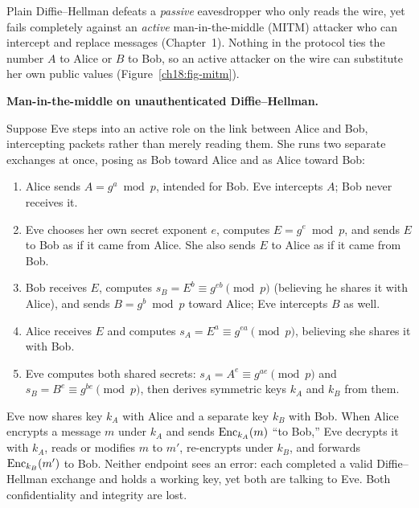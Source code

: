 Plain Diffie--Hellman defeats a \emph{passive} eavesdropper who only reads the wire, yet fails completely against an \emph{active} man-in-the-middle (MITM) attacker who can intercept and replace messages (Chapter~1). Nothing in the protocol ties the number $A$ to Alice or $B$ to Bob, so an active attacker on the wire can substitute her own public values (Figure~\ref{ch18:fig-mitm}).

\begin{attackbox}
\textbf{Man-in-the-middle on unauthenticated Diffie--Hellman.}

Suppose Eve steps into an active role on the link between Alice and Bob, intercepting packets rather than merely reading them. She runs two separate exchanges at once, posing as Bob toward Alice and as Alice toward Bob:

\begin{enumerate}
  \item Alice sends $A = g^a \bmod p$, intended for Bob. Eve intercepts $A$; Bob never receives it.
  \item Eve chooses her own secret exponent $e$, computes $E = g^e \bmod p$, and sends $E$ to Bob as if it came from Alice. She also sends $E$ to Alice as if it came from Bob.
  \item Bob receives $E$, computes $s_B = E^b \equiv g^{eb} \pmod p$ (believing he shares it with Alice), and sends $B = g^b \bmod p$ toward Alice; Eve intercepts $B$ as well.
  \item Alice receives $E$ and computes $s_A = E^a \equiv g^{ea} \pmod p$, believing she shares it with Bob.
  \item Eve computes both shared secrets: $s_A = A^e \equiv g^{ae} \pmod p$ and $s_B = B^e \equiv g^{be} \pmod p$, then derives symmetric keys $k_A$ and $k_B$ from them.
\end{enumerate}

Eve now shares key $k_A$ with Alice and a separate key $k_B$ with Bob. When Alice encrypts a message $m$ under $k_A$ and sends $\operatorname{Enc}_{k_A}(m)$ ``to Bob,'' Eve decrypts it with $k_A$, reads or modifies $m$ to $m'$, re-encrypts under $k_B$, and forwards $\operatorname{Enc}_{k_B}(m')$ to Bob. Neither endpoint sees an error: each completed a valid Diffie--Hellman exchange and holds a working key, yet both are talking to Eve. Both confidentiality and integrity are lost.
\end{attackbox}


